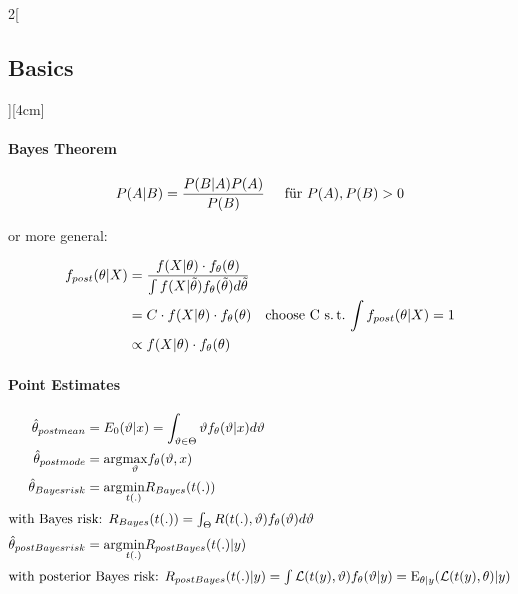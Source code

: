 \documentclass[8pt]{extarticle}
\begin{document}
\begin{multicols}{2}[\subsection{Basics}][4cm] 

\paragraph{Bayes Theorem}
$$P(A|B)=\frac{P(B|A)P(A)}{P(B)} \hspace{0.5cm} \text{für } P(A), P(B) > 0$$

or more general:

\vspace{-1 em}

\begin{align*}
  f_{post}(\theta | X) &= \frac{f(X | \theta ) \cdot f_\theta(\theta)}{\int f(X|\tilde{\theta}) f_\theta(\tilde{\theta})  d \tilde{\theta}}\\
  &= C \cdot f(X | \theta ) \cdot f_\theta(\theta) \hspace{1 em} \text{choose C s.\,t.\  $\int f_{post}(\theta | X)=1$} \\
  &\propto f(X | \theta ) \cdot f_\theta(\theta)
\end{align*}

\paragraph{Point Estimates}

\begin{align*}
\hat{\theta}_{postmean} &= E_0(\vartheta|x) = \int_{\vartheta \in \Theta} \vartheta f_\theta(\vartheta|x)d\vartheta\\
\hat{\theta}_{postmode} &= \mathrm{arg} \underset{\vartheta}{\max} f_\theta(\vartheta,x)\\
\hat{\theta}_{Bayesrisk} &= \mathrm{arg} \underset{t(.)}{\min} R_{Bayes}(t(.))\\
\intertext{with Bayes risk: $ R_{Bayes}(t(.)) = \int_{\Theta} R(t(.),\vartheta)f_\theta(\vartheta)d\vartheta$}
\hat{\theta}_{postBayesrisk} &= \mathrm{arg} \underset{t(.)}{\min} R_{postBayes}(t(.)|y)\\
\intertext{with posterior Bayes risk: $ R_{postBayes}(t(.)|y) = \int \mathcal{L}(t(y),\vartheta) f_\theta(\vartheta|y) = \mathrm{E}_{\theta|y}(\mathcal{L}(t(y),\theta)|y)$}
\end{align*}

\vspace{-1.5em}


\end{multicols}
\end{document}
